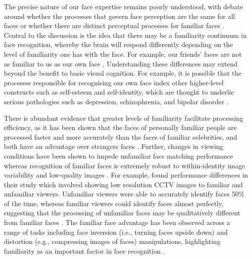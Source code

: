 \documentclass[
  10pt,
  letterpaper,
]{article}
\begin{document}
The precise nature of our face expertise remains poorly understood, with
debate around whether the processes that govern face perception are the
same for all faces or whether there are distinct perceptual processes
for familiar faces \citep{abudarham2019a, blauch2021a, collins2018a}.
Central to the discussion is the idea that there may be a familiarity
continuum in face recognition, whereby the brain will respond
differently depending on the level of familiarity one has with the face.
For example, our friends' faces are not as familiar to us as our own
face \citep{bortolon2018a, rooney2012a, tong1999a}. Understanding these
differences may extend beyond the benefit to basic visual cognition. For
example, it is possible that the processes responsible for recognising
our own face index other higher-level constructs such as self-esteem and
self-identity, which are thought to underlie serious pathologies such as
depression, schizophrenia, and bipolar disorder
\citep{felisberti2014a, oliveira2015a}.

There is abundant evidence that greater levels of familiarity facilitate
processing efficiency, as it has been shown that the faces of personally
familiar people are processed faster and more accurately than the faces
of familiar celebrities, and both have an advantage over strangers faces
\citep{bortolon2017a, burton2015a, tong1999a, young2017a}. Further,
changes in viewing conditions have been shown to impede unfamiliar face
matching performance whereas recognition of familiar faces is extremely
robust to within-identity image variability and low-quality images
\citep{burton2013a, jenkins2011a, liccione2014a}. For example,
\citet{burton1999a} found performance differences in their study which
involved showing low resolution CCTV images to familiar and unfamiliar
viewers. Unfamiliar viewers were able to accurately identify faces 50\%
of the time, whereas familiar viewers could identify faces almost
perfectly, suggesting that the processing of unfamiliar faces may be
qualitatively different from familiar faces \citep{burton1999a}. The
familiar face advantage has been observed across a range of tasks
including face inversion (i.e., turning faces upside down) and
distortion (e.g., compressing images of faces) manipulations,
highlighting familiarity as an important factor in face recognition
\citep{allen-davidian2021a, kramer2018a, yang2014a}.
\end{document}
